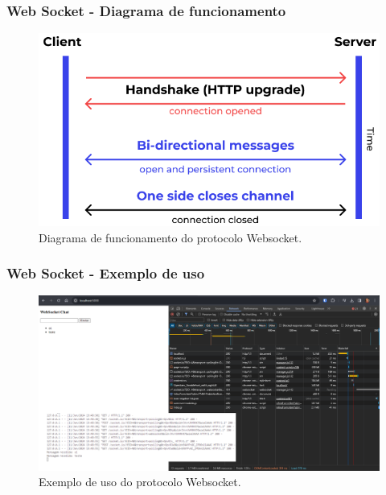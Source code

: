 \documentclass[
	10pt, %
	t, %
]{beamer}
\begin{document}
\begin{frame}
	\frametitle{Web Socket - Diagrama de funcionamento}

	\begin{figure}
		\centering
		\includegraphics[width=0.9\linewidth]{websocket.png}
		\caption{Diagrama de funcionamento do protocolo Websocket.}
		\label{fig:websocket}
	\end{figure}

\end{frame}

\begin{frame}
	\frametitle{Web Socket - Exemplo de uso}

	\begin{figure}
		\centering
		\includegraphics[width=0.9\linewidth]{websocket_example.png}
		\caption{Exemplo de uso do protocolo Websocket.}
		\label{fig:websocket_example}
	\end{figure}

\end{frame}
\end{document}
